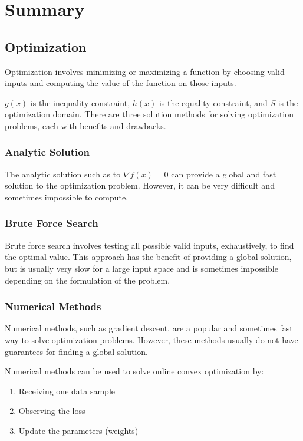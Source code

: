\documentclass[11pt]{article}
\begin{document}
\section{Summary}

\subsection{Optimization}
Optimization involves minimizing or maximizing a function by choosing valid inputs and computing the value of the function on those inputs. 


\normalfont
$g(x)$ is the inequality constraint, $h(x)$ is the equality constraint, and $S$ is the optimization domain. There are three solution methods for solving optimization problems, each with benefits and drawbacks.

\subsubsection*{Analytic Solution}
The analytic solution such as to $\nabla f(x) = 0$ can provide a global and fast solution to the optimization problem. However, it can be very difficult and sometimes impossible to compute.

\subsubsection*{Brute Force Search}
Brute force search involves testing all possible valid inputs, exhaustively, to find the optimal value. This approach has the benefit of providing a global solution, but is usually very slow for a large input space and is sometimes impossible depending on the formulation of the problem.

\subsubsection*{Numerical Methods}
Numerical methods, such as gradient descent, are a popular and sometimes fast way to solve optimization problems. However, these methods usually do not have guarantees for finding a global solution.

Numerical methods can be used to solve online convex optimization by:
\begin{enumerate}
    \item Receiving one data sample
    \item Observing the loss
    \item Update the parameters (weights)
\end{enumerate}
\end{document}
